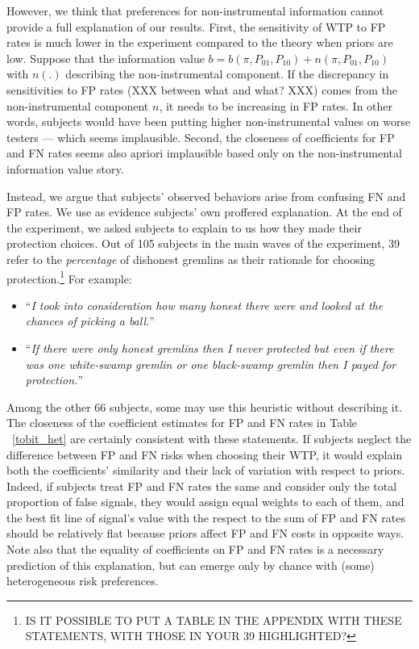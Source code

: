 \documentclass[12pt,a4paper]{article}
\newcommand{\agt}[1]{{\color{OliveGreen}#1}}
\begin{document}
However, we think that preferences for non-instrumental information cannot provide a full explanation of our results.  First, the sensitivity of WTP to FP rates is much lower in the experiment compared to the theory when priors are low. Suppose that the information value $b = b(\pi,P_{01},P_{10})+n(\pi,P_{01},P_{10})$ with $n(.)$ describing the non-instrumental component. If the discrepancy in sensitivities to FP rates \agt(XXX between what and what? XXX) comes from the non-instrumental component $n$, it needs to be increasing in FP rates. In other words, subjects would have been putting higher non-instrumental values on worse testers --- which seems implausible. Second, the closeness of coefficients for FP and FN rates seems also apriori implausible based only on the non-instrumental information value story.

Instead, we argue that subjects' observed behaviors arise from confusing FN and FP rates. We use as evidence subjects' own proffered explanation.  At the end of the experiment, we asked subjects to explain to us how they made their protection choices.  Out of 105 subjects in the main waves of the experiment, 39 refer to the \textit{percentage} \normalfont  of dishonest gremlins as their rationale for choosing protection.\footnote{IS IT POSSIBLE TO PUT A TABLE IN THE APPENDIX WITH THESE STATEMENTS, WITH THOSE IN YOUR 39 HIGHLIGHTED?}  For example:
\begin{itemize}
	\item ``\emph{I took into consideration how many honest there were and looked at the chances of picking a ball.}''
	\item ``\emph{If there were only honest gremlins then I never protected but even if there was one white-swamp gremlin or one black-swamp gremlin then I payed for protection.}''
\end{itemize}

Among the other 66 subjects, some may use this heuristic without describing it.  The closeness of the coefficient estimates for FP and FN rates in Table ~\ref{tobit_het} are certainly consistent with these statements. If subjects neglect the difference between FP and FN risks when choosing their WTP, it would explain both the coefficients' similarity and their lack of variation with respect to priors. Indeed, if subjects treat FP and FN rates the same and consider only the total proportion of false signals, they would assign equal weights to each of them, and the best fit line of signal's value with the respect to the sum of FP and FN rates should be relatively flat because priors affect FP and FN costs in opposite ways. Note also that the equality of coefficients on FP and FN rates is a necessary prediction of this explanation, but can emerge only by chance with (some) heterogeneous risk preferences.
\end{document}
